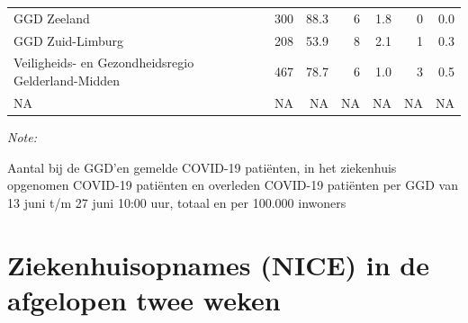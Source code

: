 \documentclass[
  english,
  man,floatsintext]{apa6}
\begin{document}
\begin{table}
\begin{threeparttable}
\begin{tabular}{lrrrrrr}
GGD Zeeland & 300 & 88.3 & 6 & 1.8 & 0 & 0.0\\
GGD Zuid-Limburg & 208 & 53.9 & 8 & 2.1 & 1 & 0.3\\
Veiligheids- en Gezondheidsregio Gelderland-Midden & 467 & 78.7 & 6 & 1.0 & 3 & 0.5\\
NA & NA & NA & NA & NA & NA & NA\\
\bottomrule
\end{tabular}
\begin{tablenotes}
\item \textit{Note: } 
\item Aantal bij de GGD’en gemelde COVID-19 patiënten, in het ziekenhuis opgenomen COVID-19 patiënten en overleden COVID-19 patiënten per GGD van 13 juni t/m 27 juni 10:00 uur, totaal en per 100.000 inwoners
\end{tablenotes}
\end{threeparttable}
\endgroup{}
\end{table}

\newpage

\hypertarget{ziekenhuisopnames-nice-in-de-afgelopen-twee-weken}{%
\section{Ziekenhuisopnames (NICE) in de afgelopen twee weken}\label{ziekenhuisopnames-nice-in-de-afgelopen-twee-weken}}
\end{document}
